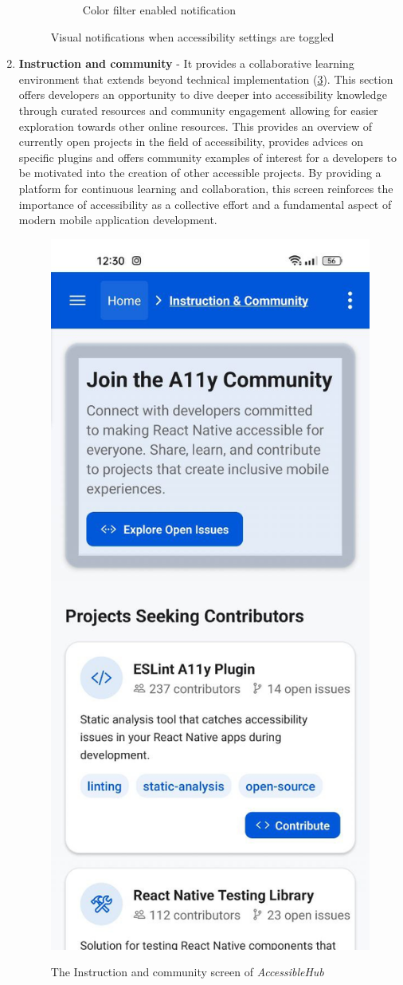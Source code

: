 \begin{enumerate}
\begin{figure}[ht]
\begin{subfigure}[b]{0.48\textwidth}
        \caption{Color filter enabled notification}
        \label{fig:settings-filter-notification}
    \end{subfigure}
    \caption{Visual notifications when accessibility settings are toggled}
    \label{fig:settings_notifications}
\end{figure}

\pagebreak

\item \textbf{Instruction and community} - It provides a collaborative learning environment that extends beyond technical implementation (\ref{fig:instruction-community}). This section offers developers an opportunity to dive deeper into accessibility knowledge through curated resources and community engagement allowing for easier exploration towards other online resources. This provides an overview of currently open projects in the field of accessibility, provides advices on specific plugins and offers community examples of interest for a developers to be motivated into the creation of other accessible projects. By providing a platform for continuous learning and collaboration, this screen reinforces the importance of accessibility as a collective effort and a fundamental aspect of modern mobile application development.

\begin{figure}[ht]
\centering
\includegraphics[width=0.4\linewidth, alt={Screenshot of the Instruction and community screen of AccessibleHub}]{img/instruction-community.jpg}
\caption{The Instruction and community screen of \textit{AccessibleHub}}\label{fig:instruction-community}
\end{figure}
    
\end{enumerate}

